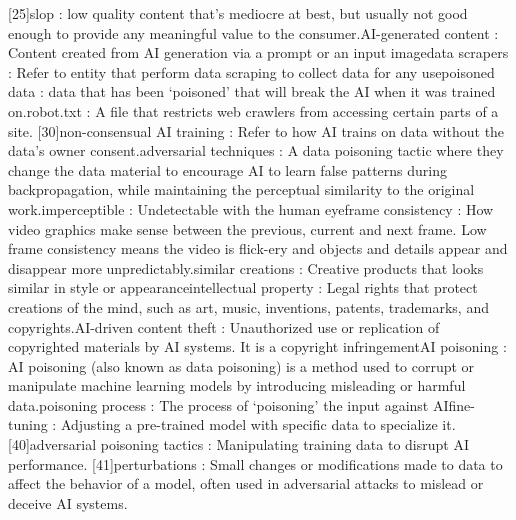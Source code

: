 [25]slop : low quality content that’s mediocre at best, but usually not good enough to provide any meaningful value to the consumer.\newline
[26]AI-generated content : Content created from AI generation via a prompt or an input image\newline
[27]data scrapers : Refer to entity that perform data scraping to collect data for any use\newline
[28]poisoned data : data that has been ‘poisoned’ that will break the AI when it was trained on.\newline
[29]robot.txt :  A file that restricts web crawlers from accessing certain parts of a site.
[30]non-consensual AI training : Refer to how AI trains on data without the data’s owner consent.\newline
[31]adversarial techniques : A data poisoning tactic where they change the data material to encourage AI to learn false patterns during backpropagation, while maintaining the perceptual similarity to the original work.\newline
[32]imperceptible : Undetectable with the human eye\newline
[33]frame consistency : How video graphics make sense between the previous, current and next frame. Low frame consistency means the video is flick-ery and objects and details appear and disappear more unpredictably.\newline
[34]similar creations : Creative products that looks similar in style or appearance\newline
[35]intellectual property : Legal rights that protect creations of the mind, such as art, music, inventions, patents, trademarks, and copyrights.\newline
[36]AI-driven content theft : Unauthorized use or replication of copyrighted materials by AI systems. It is a copyright infringement\newline
[37]AI poisoning : AI poisoning (also known as data poisoning) is a method used to corrupt or manipulate machine learning models by introducing misleading or harmful data.\newline
[38]poisoning process : The process of ‘poisoning’ the input against AI\newline
[39]fine-tuning : Adjusting a pre-trained model with specific data to specialize it.
[40]adversarial poisoning tactics : Manipulating training data to disrupt AI performance.
[41]perturbations : Small changes or modifications made to data to affect the behavior of a model, often used in adversarial attacks to mislead or deceive AI systems.
